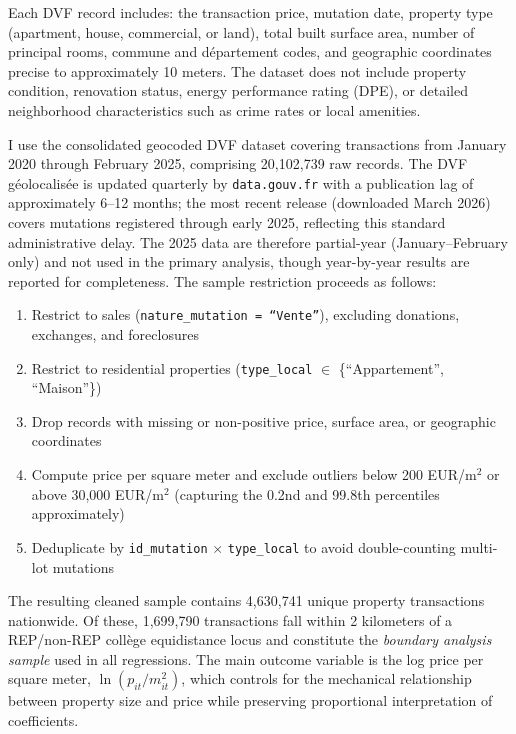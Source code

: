 \documentclass[12pt]{article}
\begin{document}
Each DVF record includes: the transaction price, mutation date, property type (apartment, house, commercial, or land), total built surface area, number of principal rooms, commune and d\'{e}partement codes, and geographic coordinates precise to approximately 10 meters. The dataset does not include property condition, renovation status, energy performance rating (DPE), or detailed neighborhood characteristics such as crime rates or local amenities.

I use the consolidated geocoded DVF dataset covering transactions from January 2020 through February 2025, comprising 20,102,739 raw records. The DVF g\'{e}olocalis\'{e}e is updated quarterly by \texttt{data.gouv.fr} with a publication lag of approximately 6--12 months; the most recent release (downloaded March 2026) covers mutations registered through early 2025, reflecting this standard administrative delay. The 2025 data are therefore partial-year (January--February only) and not used in the primary analysis, though year-by-year results are reported for completeness. The sample restriction proceeds as follows:
\begin{enumerate}
\item Restrict to sales (\texttt{nature\_mutation = ``Vente''}), excluding donations, exchanges, and foreclosures
\item Restrict to residential properties (\texttt{type\_local} $\in$ \{``Appartement'', ``Maison''\})
\item Drop records with missing or non-positive price, surface area, or geographic coordinates
\item Compute price per square meter and exclude outliers below 200 EUR/m$^2$ or above 30,000 EUR/m$^2$ (capturing the 0.2nd and 99.8th percentiles approximately)
\item Deduplicate by \texttt{id\_mutation} $\times$ \texttt{type\_local} to avoid double-counting multi-lot mutations
\end{enumerate}

The resulting cleaned sample contains 4,630,741 unique property transactions nationwide. Of these, 1,699,790 transactions fall within 2 kilometers of a REP/non-REP coll\`{e}ge equidistance locus and constitute the \textit{boundary analysis sample} used in all regressions. The main outcome variable is the log price per square meter, $\ln(p_{it}/m^2_{it})$, which controls for the mechanical relationship between property size and price while preserving proportional interpretation of coefficients.
\end{document}
